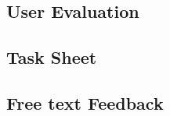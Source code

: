 \begin{appendices}
\chapter{User Evaluation}


\section{Task Sheet}



\section{Free text Feedback}


\end{appendices}
